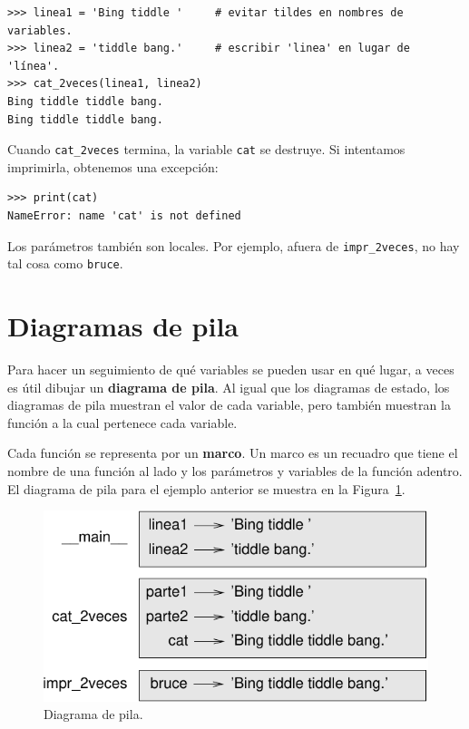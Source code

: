 \documentclass[10pt]{book}
\begin{document}
\begin{verbatim}
>>> linea1 = 'Bing tiddle '     # evitar tildes en nombres de variables.
>>> linea2 = 'tiddle bang.'     # escribir 'linea' en lugar de 'línea'.
>>> cat_2veces(linea1, linea2)
Bing tiddle tiddle bang.
Bing tiddle tiddle bang.
\end{verbatim}
%
Cuando \verb"cat_2veces" termina, la variable {\tt cat}
se destruye.  Si intentamos imprimirla, obtenemos una excepción:

\begin{verbatim}
>>> print(cat)
NameError: name 'cat' is not defined
\end{verbatim}
%
Los parámetros también son locales.
Por ejemplo, afuera de \verb"impr_2veces", no hay
tal cosa como {\tt bruce}.


\section{Diagramas de pila}
\label{stackdiagram}

Para hacer un seguimiento de qué variables se pueden usar en qué lugar, a veces es
útil dibujar un {\bf diagrama de pila}.  Al igual que los diagramas de estado,
los diagramas de pila muestran el valor de cada variable, pero también muestran la
función a la cual pertenece cada variable.

Cada función se representa por un {\bf marco}.  Un marco es un recuadro que tiene
el nombre de una función al lado y los parámetros y variables de
la función adentro.  El diagrama de pila para el ejemplo anterior se
muestra en la Figura~\ref{fig.stack}.

\begin{figure}
\centerline
{\includegraphics[scale=0.8]{figs/stack.pdf}}
\caption{Diagrama de pila.}
\label{fig.stack}
\end{figure}
\end{document}

